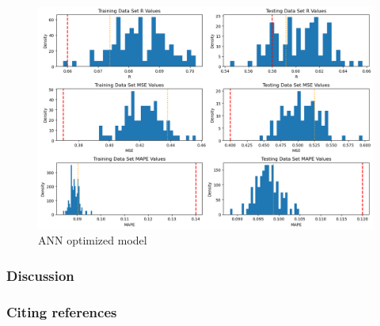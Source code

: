 \documentclass{article}
\begin{document}
\begin{figure}
	\centering
	\includegraphics[width=\linewidth]{figures/ANN_optimized_model.png}
	\caption{ANN optimized model}
	\label{fig:ANN-optimized-model}
\end{figure}




\subsubsection{Discussion}



\subsubsection{Citing references}




\end{document}
